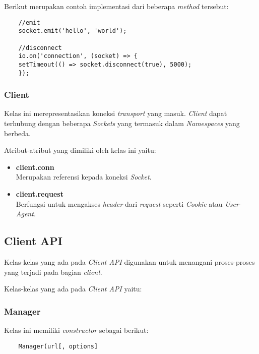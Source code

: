 Berikut merupakan contoh implementasi dari beberapa \textit{method} tersebut:

\begin{lstlisting}
	//emit
	socket.emit('hello', 'world');
	
	//disconnect
	io.on('connection', (socket) => {
	setTimeout(() => socket.disconnect(true), 5000);
	});
\end{lstlisting}

\subsubsection{Client}
Kelas ini merepresentasikan koneksi \textit{transport} yang masuk\cite{socketioclient}. \textit{Client} dapat terhubung dengan beberapa \textit{Sockets} yang termasuk dalam \textit{Namespaces} yang berbeda.

Atribut-atribut yang dimiliki oleh kelas ini yaitu: 

\begin{itemize}
	\item \textbf{client.conn} \\ Merupakan referensi kepada koneksi \textit{Socket}.
	\item \textbf{client.request} \\ Berfungsi untuk mengakses \textit{header} dari \textit{request} seperti \textit{Cookie} atau \textit{User-Agent}.
\end{itemize}

\subsection{Client API}
Kelas-kelas yang ada pada \textit{Client API} digunakan untuk menangani proses-proses yang terjadi pada bagian \textit{client}. 

Kelas-kelas yang ada pada \textit{Client API} yaitu: 

\subsubsection{Manager}
Kelas ini memiliki \textit{constructor} sebagai berikut: 

\begin{lstlisting}
	Manager(url[, options]
\end{lstlisting}


